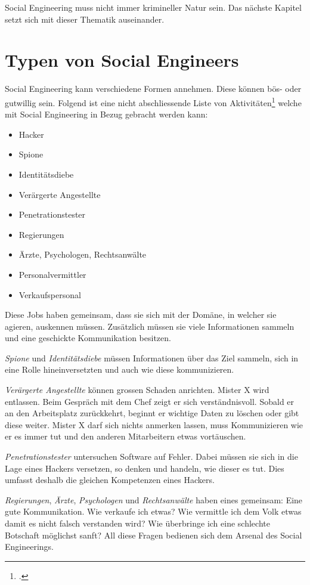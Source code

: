Social Engineering muss nicht immer krimineller Natur sein. Das nächste Kapitel setzt sich mit dieser Thematik auseinander.

\section{Typen von Social Engineers}
Social Engineering kann verschiedene Formen annehmen. Diese können bös- oder gutwillig sein. Folgend ist eine nicht abschliessende Liste von Aktivitäten\footcite{human_hacking} welche mit Social Engineering in Bezug gebracht werden kann:

\begin{itemize}
\item Hacker
\item Spione
\item Identitätsdiebe
\item Verärgerte Angestellte
\item Penetrationstester
\item Regierungen
\item Ärzte, Psychologen, Rechtsanwälte
\item Personalvermittler
\item Verkaufspersonal 
\end{itemize}

Diese Jobs haben gemeinsam, dass sie sich mit der Domäne, in welcher sie agieren, auskennen müssen. Zusätzlich müssen sie viele Informationen sammeln und eine geschickte Kommunikation besitzen.

\textit{Spione} und \textit{Identitätsdiebe} müssen Informationen über das Ziel sammeln, sich in eine Rolle hineinversetzten und auch wie diese kommunizieren.

\textit{Verärgerte Angestellte} können grossen Schaden anrichten. Mister X wird entlassen. Beim Gespräch mit dem Chef zeigt er sich verständnisvoll. Sobald er an den Arbeitsplatz zurückkehrt, beginnt er wichtige Daten zu löschen oder gibt diese weiter. Mister X darf sich nichts anmerken lassen, muss Kommunizieren wie er es immer tut und den anderen Mitarbeitern etwas vortäuschen.

\textit{Penetrationstester} untersuchen Software auf Fehler. Dabei müssen sie sich in die Lage eines Hackers versetzen, so denken und handeln, wie dieser es tut. Dies umfasst deshalb die gleichen Kompetenzen eines Hackers.

\textit{Regierungen}, \textit{Ärzte}, \textit{Psychologen} und \textit{Rechtsanwälte} haben eines gemeinsam: Eine gute Kommunikation. Wie verkaufe ich etwas? Wie vermittle ich dem Volk etwas damit es nicht falsch verstanden wird? Wie überbringe ich eine schlechte Botschaft möglichst sanft? All diese Fragen bedienen sich dem Arsenal des Social Engineerings.


